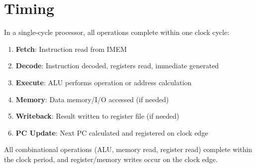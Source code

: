 \section{Timing}

In a single-cycle processor, all operations complete within one clock cycle:

\begin{enumerate}
    \item \textbf{Fetch}: Instruction read from IMEM
    \item \textbf{Decode}: Instruction decoded, registers read, immediate generated
    \item \textbf{Execute}: ALU performs operation or address calculation
    \item \textbf{Memory}: Data memory/I/O accessed (if needed)
    \item \textbf{Writeback}: Result written to register file (if needed)
    \item \textbf{PC Update}: Next PC calculated and registered on clock edge
\end{enumerate}

All combinational operations (ALU, memory read, register read) complete within the clock period, and register/memory writes occur on the clock edge.

